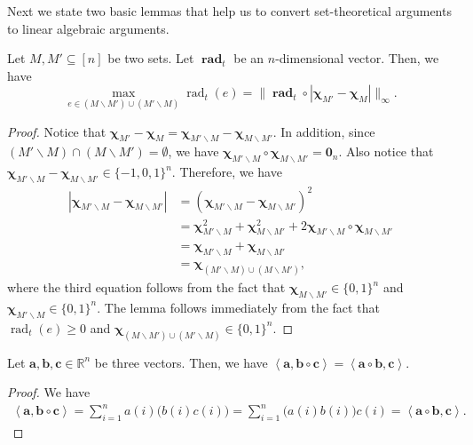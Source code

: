 \documentclass{article}
\newcommand{\del}{\backslash}
\newcommand{\RR}{\mathbb R}
\DeclareMathOperator{\rad}{rad}
\newcommand{\inn}[1]{\left\langle #1 \right\rangle}
\renewcommand{\vec}[1]{\boldsymbol{#1}}
\renewcommand{\odot}{\circ}
\begin{document}
Next we state two basic lemmas that help us to convert set-theoretical arguments to linear algebraic arguments.
\begin{lemma}
\label{lemma:max}
Let $M, M' \subseteq [n]$ be two sets. Let $\vec \rad_t$ be an $n$-dimensional vector.
Then, we have 
$$ \max_{e \in (M\del M') \cup (M'\del M)} \rad_t(e) = \big\|\vec \rad_t \odot |\vec \chi_{M'} - \vec \chi_M| \big\|_\infty.$$
\end{lemma}

\begin{proof}
Notice that $\vec\chi_{M'}-\vec\chi_{M} = \vec\chi_{M'\del M}-\vec\chi_{M\del M'}$.
In addition, since $(M'\del M) \cap (M\del M') = \emptyset$, we have
$\vec \chi_{M'\del M} \odot \vec\chi_{M\del M'} = \vec 0_n$. 
Also notice that $ \vec\chi_{M'\del M}-\vec\chi_{M\del M'} \in \{-1,0,1\}^n$.
Therefore, we have
\begin{align*}
|\vec\chi_{M'\del M}-\vec\chi_{M\del M'}| 
&= (\vec\chi_{M'\del M}-\vec\chi_{M\del M'})^2\\
&=\vec\chi_{M'\del M}^2+\vec\chi_{M\del M'}^2+2\vec \chi_{M'\del M} \odot \vec\chi_{M\del M'} \\
&=\vec\chi_{M'\del M}+\vec\chi_{M\del M'}\\
& = \vec\chi_{(M' \del M) \cup (M\del M')},
\end{align*}
where the third equation follows from the fact that $\vec\chi_{M\del M'}\in \{0,1\}^n$ and $\vec\chi_{M'\del M}\in\{0,1\}^n$.
The lemma follows immediately from the fact that $\rad_t(e) \ge 0$ and  $\vec\chi_{(M\del M')\cup(M'\del M)}\in \{0,1\}^n$.
\end{proof}

\begin{lemma}
\label{lemma:vector-technical}
Let $\vec a,\vec b, \vec c \in \RR^n$ be three vectors.
Then, we have $\inn{\vec a, \vec b\odot \vec c} = \inn{\vec a\odot \vec b,\vec c}$.
\end{lemma}

\begin{proof}
We have
\begin{align*}
	\inn{\vec a,\vec b\odot \vec c} = \sum_{i=1}^n a(i) \big(b(i) c(i)\big) = \sum_{i=1}^n \big(a(i)b(i)\big)c(i) = \inn{\vec a\odot\vec b,\vec c}.
\end{align*}
\end{proof}
\end{document}
